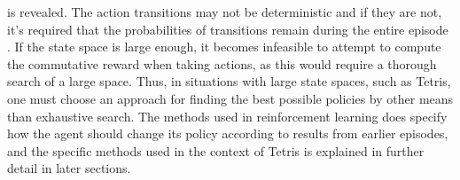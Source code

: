 is revealed. The action transitions may 
not be deterministic and if they are not,
it's required that the probabilities of transitions
remain during the entire episode \citep{Carr}. If the state space 
is large enough, it becomes infeasible to attempt to compute 
the commutative reward when taking actions, as this would require
a thorough search of a large space. Thus, in situations 
with large state spaces, such as Tetris, one must choose 
an approach for finding the best possible policies by other
means than exhaustive search. The methods used in reinforcement learning 
does specify how the agent should change its policy according to 
results from earlier episodes, and the specific methods used in
the context of Tetris is explained in further detail in later sections.













